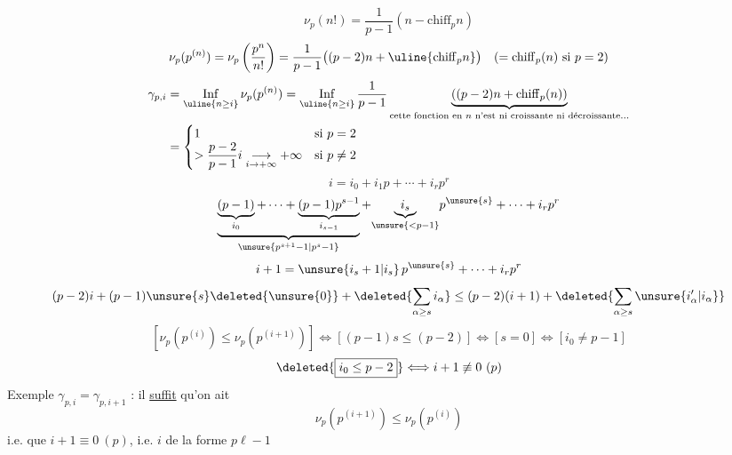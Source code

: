 \[
\nu_p(n!)=\frac1{p-1}(n-\mathrm{chiff}_p n)
\]
\[
\nu_p(p^{(n)})=\nu_p\left(\frac{p^n}{n!}\right)=\frac1{p-1}\bigl((p-2)n+\uline{\mathrm{chiff}_p n}\bigr)\quad(=\mathrm{chiff}_p(n)\text{ si }p=2)
\]
\[
\begin{aligned}
\gamma_{p,i}&=\mathop{\mathrm{Inf}}_{\uline{n\geq i}}\nu_p(p^{(n)})=\mathop{\mathrm{Inf}}_{\uline{n\geq i}}\frac1{p-1}\underbrace{((p-2)n+\mathrm{chiff}_p(n))}_{\text{cette fonction en }n\text{ n'est ni croissante ni décroissante}\ldots}\\
&=\begin{cases}1&\text{si }p=2\\>\dfrac{p-2}{p-1}i\underset{i\to+\infty}{\longrightarrow}+\infty&\text{si }p\ne2\end{cases}
\end{aligned}
\]
\[
i=i_0+i_1p+\cdots+i_rp^r
\]
\[
\underbrace{\underbrace{(p-1)}_{i_0}+\cdots+\underbrace{(p-1)p^{s-1}}_{i_{s-1}}}_{\unsure{p^{s+1}-1|p^s-1}}+\underset{\unsure{<p-1}}{\underbrace{i_s}}p^{\unsure{s}}+\cdots+i_rp^r
\]
\[
i+1=\unsure{i_s+1|i_s}\,p^{\unsure{s}}+\cdots+i_rp^r
\]
\[
(p-2)i+(p-1)\unsure{s}\deleted{\unsure{0}}+\deleted{\sum_{\alpha\geq s}i_\alpha}\leq(p-2)(i+1)+\deleted{\sum_{\alpha\geq s}\unsure{i'_\alpha|i_\alpha}}
\]
\[
[\nu_p(p^{(i)})\leq\nu_p(p^{(i+1)})]\Longleftrightarrow[(p-1)s\leq(p-2)]\Longleftrightarrow[s=0]\Longleftrightarrow[i_0\ne p-1]
\]
\[
\deleted{\boxed{i_0\leq p-2}}\Longleftrightarrow i+1\not\equiv0\ (p)
\]
Exemple  $\gamma_{p,i}=\gamma_{p,i+1}$ : il \uline{suffit} qu'on ait 
\[
\nu_p(p^{(i+1)})\leq\nu_p(p^{(i)})
\]
i.e. que   $i+1\equiv0\ (p)$,
i.e. $i$ de la forme $p\ell-1$
